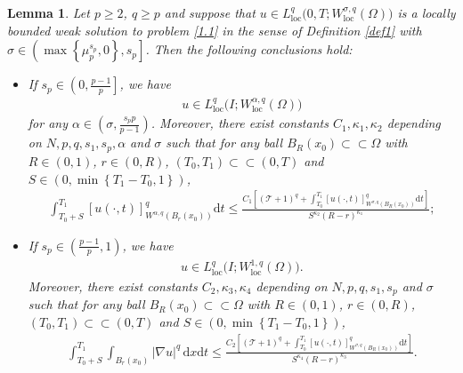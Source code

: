 \documentclass[reqno,10pt]{amsart}
\numberwithin{equation}{section}
\newtheorem{lemma}[theorem]{Lemma}
\begin{document}
\begin{lemma}
	\label{lem13}
	Let $p\ge2$, $q\ge p$ and suppose that $u\in L^q_{\mathrm{loc}}\bigl(0,T;W^{\sigma,q}_{\mathrm{loc}}(\Omega)\bigl)$ is a locally bounded weak solution to problem \eqref{1.1} in the sense of Definition \ref{def1} with $\sigma\in \left( \max\left\lbrace\mu^{s_p}_p,0\right\rbrace,s_p\right]$. Then the following conclusions hold:
	\begin{itemize}
		\item[(i)] If $s_p\in\left(0,\frac{p-1}{p}\right]$, we have
		\begin{align*}
			u\in L^q_{\mathrm{loc}}\bigl(I;W^{\alpha,q}_{\mathrm{loc}}(\Omega)\bigl)
		\end{align*}
		for any $\alpha\in\left( \sigma,\frac{s_pp}{p-1}\right) $. Moreover, there exist constants $C_1,\kappa_1,\kappa_2$ depending on $N,p,q,s_1,s_p,\alpha$ and $\sigma$ such that for any ball $B_R(x_0)\subset\subset\Omega$ with $R\in(0,1)$, $r\in (0,R)$, $(T_0,T_1)\subset\subset(0,T)$ and $S\in \left( 0,\min\left\lbrace T_1-T_0,1\right\rbrace \right) $,
		\begin{align*}
			\int_{T_0+S}^{T_1}[u(\cdot,t)]^q_{W^{\alpha,q}\left( B_r(x_0)\right) }\mathrm{d}t\le\frac{C_1\left[\left(\mathcal{T}+1\right)^q+\int_{T_0}^{T_1}[u(\cdot,t)]^q_{W^{\sigma,q}\left( B_R(x_0)\right)}\mathrm{d}t\right]}{S^{\kappa_2}(R-r)^{\kappa_1}};
		\end{align*}
		\item[(ii)] If $s_p\in \left(\frac{p-1}{p},1\right)$, we have
		\begin{align*}
			u\in L^q_{\mathrm{loc}}\bigl(I;W^{1,q}_{\mathrm{loc}}(\Omega)\bigl).
		\end{align*}
		Moreover, there exist constants $C_2,\kappa_3,\kappa_4$ depending on $N,p,q,s_1,s_p$ and $\sigma$ such that for any ball $B_R(x_0)\subset\subset\Omega$ with $R\in(0,1)$, $r\in (0,R)$, $(T_0,T_1)\subset\subset(0,T)$ and $S\in \left( 0,\min\left\lbrace T_1-T_0,1\right\rbrace \right) $,
		\begin{align*}
			\int_{T_0+S}^{T_1}\int_{B_r(x_0)}|\nabla u|^q\,\mathrm{d}x\mathrm{d}t\le\frac{C_2\left[\left(\mathcal{T}+1\right)^q+\int_{T_0}^{T_1}[u(\cdot,t)]^q_{W^{\sigma,q}\left( B_R(x_0)\right)}\mathrm{d}t\right]}{S^{\kappa_4}(R-r)^{\kappa_3}}.
		\end{align*}
	\end{itemize}
\end{lemma}
\end{document}
